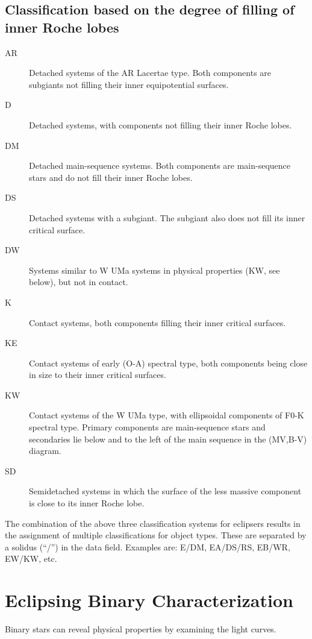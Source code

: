\subsection{Classification based on the degree of filling of inner Roche lobes}
\begin{description}
    \item[AR]   Detached systems of the AR Lacertae type. Both components are subgiants not filling their inner equipotential surfaces.

    \item[D]   Detached systems, with components not filling their inner Roche lobes.

    \item[DM]   Detached main-sequence systems. Both components are main-sequence stars and do not fill their inner Roche lobes.

    \item[DS]   Detached systems with a subgiant. The subgiant also does not fill its inner critical surface.

    \item[DW]   Systems similar to W UMa systems in physical properties (KW, see below), but not in contact.

    \item[K]   Contact systems, both components filling their inner critical surfaces.

    \item[KE]   Contact systems of early (O-A) spectral type, both components being close in size to their inner critical surfaces.

    \item[KW]   Contact systems of the W UMa type, with ellipsoidal components of F0-K spectral type. Primary components are main-sequence stars and secondaries lie below and to the left of the main sequence in the (MV,B-V) diagram.

    \item[SD]   Semidetached systems in which the surface of the less massive component is close to its inner Roche lobe.
\end{description}

The combination of the above three classification systems for eclipsers results in the assignment of multiple classifications for object types. These are separated by a solidus (``/'') in the data field. Examples are: E/DM, EA/DS/RS, EB/WR, EW/KW, etc.


\section{Eclipsing Binary Characterization}
Binary stars can reveal physical properties by examining the light curves.


